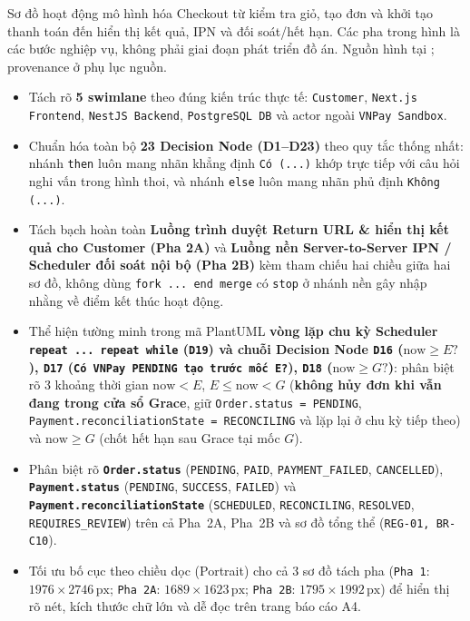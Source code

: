 Sơ đồ hoạt động mô hình hóa Checkout từ kiểm tra giỏ, tạo đơn và khởi tạo
thanh toán đến hiển thị kết quả, IPN và đối soát/hết hạn. Các pha trong hình là
các bước nghiệp vụ, không phải giai đoạn phát triển đồ án. Nguồn hình tại
; provenance ở phụ lục nguồn.
\begin{itemize}
  \item Tách rõ \textbf{5 swimlane} theo đúng kiến trúc thực tế: \texttt{Customer}, \texttt{Next.js Frontend}, \texttt{NestJS Backend}, \texttt{PostgreSQL DB} và actor ngoài \texttt{VNPay Sandbox}.
  \item Chuẩn hóa toàn bộ \textbf{23 Decision Node (D1--D23)} theo quy tắc thống nhất: nhánh \texttt{then} luôn mang nhãn khẳng định \texttt{Có (...)} khớp trực tiếp với câu hỏi nghi vấn trong hình thoi, và nhánh \texttt{else} luôn mang nhãn phủ định \texttt{Không (...)}.
  \item Tách bạch hoàn toàn \textbf{Luồng trình duyệt Return URL \& hiển thị kết quả cho Customer (Pha 2A)} và \textbf{Luồng nền Server-to-Server IPN / Scheduler đối soát nội bộ (Pha 2B)} kèm tham chiếu hai chiều giữa hai sơ đồ, không dùng \texttt{fork ... end merge} có \texttt{stop} ở nhánh nền gây nhập nhằng về điểm kết thúc hoạt động.
  \item Thể hiện tường minh trong mã PlantUML \textbf{vòng lặp chu kỳ Scheduler \texttt{repeat ... repeat while} (\texttt{D19}) và chuỗi Decision Node \texttt{D16} (\(\text{now} \ge E?\)), \texttt{D17} (\texttt{Có VNPay PENDING tạo trước mốc E?}), \texttt{D18} (\(\text{now} \ge G?\))}: phân biệt rõ 3 khoảng thời gian \(\text{now} < E\), \(E \le \text{now} < G\) (\textbf{không hủy đơn khi vẫn đang trong cửa sổ Grace}, giữ \texttt{Order.status = PENDING}, \texttt{Payment.reconciliationState = RECONCILING} và lặp lại ở chu kỳ tiếp theo) và \(\text{now} \ge G\) (chốt hết hạn sau Grace tại mốc \(G\)).
  \item Phân biệt rõ \textbf{\texttt{Order.status}} (\texttt{PENDING}, \texttt{PAID}, \texttt{PAYMENT\_FAILED}, \texttt{CANCELLED}), \textbf{\texttt{Payment.status}} (\texttt{PENDING}, \texttt{SUCCESS}, \texttt{FAILED}) và \textbf{\texttt{Payment.reconciliationState}} (\texttt{SCHEDULED}, \texttt{RECONCILING}, \texttt{RESOLVED}, \texttt{REQUIRES\_REVIEW}) trên cả Pha~2A, Pha~2B và sơ đồ tổng thể (\texttt{REG-01, BR-C10}).
  \item Tối ưu bố cục theo chiều dọc (Portrait) cho cả 3 sơ đồ tách pha (\texttt{Pha 1}: \(1976 \times 2746\,\text{px}\); \texttt{Pha 2A}: \(1689 \times 1623\,\text{px}\); \texttt{Pha 2B}: \(1795 \times 1992\,\text{px}\)) để hiển thị rõ nét, kích thước chữ lớn và dễ đọc trên trang báo cáo A4.
\end{itemize}

